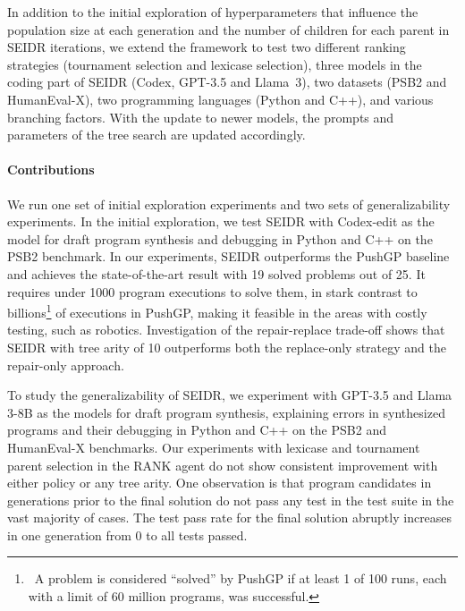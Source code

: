 In addition to the initial exploration of hyperparameters that influence the population size at each generation and the number of children for each parent in SEIDR iterations, we extend the framework to test two different ranking strategies (tournament selection and lexicase selection), three models in the coding part of SEIDR (Codex, GPT-3.5 and Llama~3), two datasets (PSB2 and HumanEval-X), two programming languages (Python and C++), and various branching factors. 
With the update to newer models, the prompts and parameters of the tree search are updated accordingly. 

\paragraph{Contributions}
We run one set of initial exploration experiments and two sets of generalizability experiments. 
In the initial exploration, we test SEIDR with Codex-edit as the model for draft program synthesis and debugging in Python and C++ on the PSB2 benchmark. 
In our experiments, SEIDR outperforms the PushGP baseline and achieves the state-of-the-art result with 19 solved problems out of 25. 
It requires under 1000 program executions to solve them, in stark contrast to billions\footnote{~A problem is considered ``solved'' by PushGP if at least 1 of 100 runs, each with a limit of 60 million programs, was successful.} of executions in PushGP, making it feasible in the areas with costly testing, such as robotics.
Investigation of the repair-replace trade-off shows that SEIDR with tree arity of 10 outperforms both the replace-only strategy and the repair-only approach. 

To study the generalizability of SEIDR, we experiment with GPT-3.5 and Llama 3-8B as the models for draft program synthesis, explaining errors in synthesized programs and their debugging in Python and C++ on the PSB2 and HumanEval-X benchmarks. 
Our experiments with lexicase and tournament parent selection in the RANK agent do not show consistent improvement with either policy or any tree arity. 
One observation is that program candidates in generations prior to the final solution do not pass any test in the test suite in the vast majority of cases. 
The test pass rate for the final solution abruptly increases in one generation from 0 to all tests passed. 

